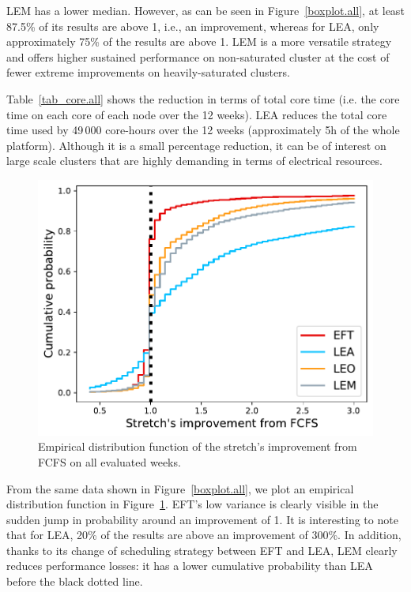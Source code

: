 \documentclass[conference]{IEEEtran}
\begin{document}
LEM has a lower median.
However, as can be seen in Figure~\ref{boxplot.all}, at least 87.5\% of its results are above 1, i.e., an improvement, whereas for LEA, only approximately 75\% of the results are above 1. 
LEM is a more versatile strategy and offers higher sustained performance on non-saturated cluster at the cost
of fewer extreme improvements on heavily-saturated clusters.

\begin{table}
\end{table}

Table~\ref{tab_core.all} shows the reduction in terms of total core time (i.e. the core time on each core of each node over the 12 weeks). 
LEA reduces the total core time used by 49\,000 core-hours over the 12 weeks (approximately 5h of the whole platform).
Although it is a small percentage reduction, it can be of interest on large scale clusters that are highly demanding in terms of electrical resources.

\begin{figure}[t]\centering\includegraphics[width=0.9\linewidth]{../MBSS/plot/ECDF/byuser/ecdf_stretch_all-all.pdf}\caption{Empirical distribution function of the stretch's improvement from FCFS on all evaluated weeks.}\label{ecdf}\end{figure}
From the same data shown in Figure~\ref{boxplot.all}, we plot an empirical distribution function in Figure~\ref{ecdf}.
EFT's low variance is clearly visible in the sudden jump in probability around an improvement of 1.
It is interesting to note that for LEA, 20\% of the results are above an improvement of 300\%.
In addition, thanks to its change of scheduling strategy between EFT and LEA, LEM clearly reduces
performance losses: it has a lower cumulative probability than LEA before the black dotted line.
\end{document}
